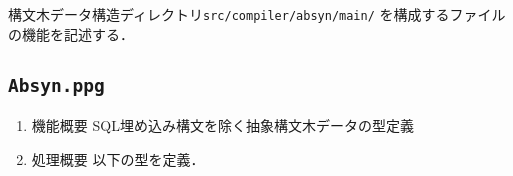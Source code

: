\documentclass{jbook}
\newcommand{\code}[1]{\mbox{\large\tt #1}}
\begin{document}
\ifjp%
	構文木データ構造ディレクトリ\code{src/compiler/absyn/main/}
を構成するファイルの機能を記述する．


\subsection{\code{Absyn.ppg}}
\begin{enumerate}
\item 機能概要 SQL埋め込み構文を除く抽象構文木データの型定義
\item 処理概要 
	以下の型を定義．


\end{enumerate}
\end{document}
